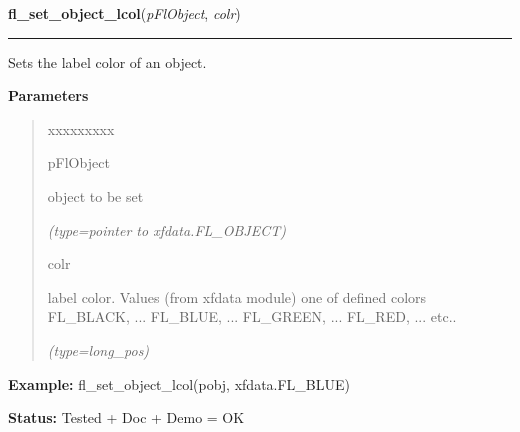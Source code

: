 \hspace{.8\funcindent}\begin{boxedminipage}{\funcwidth}

    \raggedright \textbf{fl\_set\_object\_lcol}(\textit{pFlObject}, \textit{colr})

    \vspace{-1.5ex}

    \rule{\textwidth}{0.5\fboxrule}
\setlength{\parskip}{2ex}
    Sets the label color of an object.

\setlength{\parskip}{1ex}
      \textbf{Parameters}
      \vspace{-1ex}

      \begin{quote}
        \begin{Ventry}{xxxxxxxxx}

          \item[pFlObject]

          object to be set

            {\it (type=pointer to xfdata.FL\_OBJECT)}

          \item[colr]

          label color. Values (from xfdata module) one of defined colors 
          FL\_BLACK, ... FL\_BLUE, ... FL\_GREEN, ... FL\_RED, ... etc..

            {\it (type=long\_pos)}

        \end{Ventry}

      \end{quote}

\textbf{Example:} fl\_set\_object\_lcol(pobj, xfdata.FL\_BLUE)



\textbf{Status:} Tested + Doc + Demo = OK



    \end{boxedminipage}

    \label{xformslib:flbasic:fl_set_object_lcol}

    \vspace{0.5ex}

